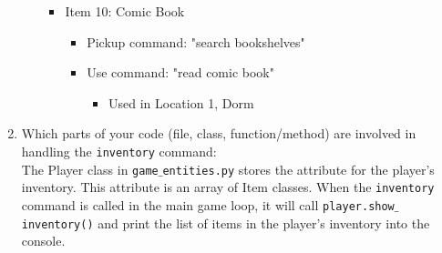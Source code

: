 \documentclass[11pt]{article}
\begin{document}
\begin{enumerate}
\begin{enumerate}
\begin{itemize}
\begin{itemize}
\begin{itemize}
            \end{itemize}
        \end{itemize}
        \item Item 10: Comic Book
        \begin{itemize}
            \item Pickup command: "search bookshelves"
            \item Use command: "read comic book"
            \begin{itemize}
                \item Used in Location 1, Dorm
            \end{itemize}
        \end{itemize}
    \end{itemize}
\end{enumerate}

    \item Which parts of your code (file, class, function/method) are involved in handling the \texttt{inventory} command:\\
    The Player class in \texttt{game$\_$entities.py} stores the attribute for the player's inventory. This attribute is an array of Item classes. When the \texttt{inventory} command is called in the main game loop, it will call  \texttt{player.show$\_$inventory()} and print the list of items in the player's inventory into the console.
\end{enumerate}
\end{document}
